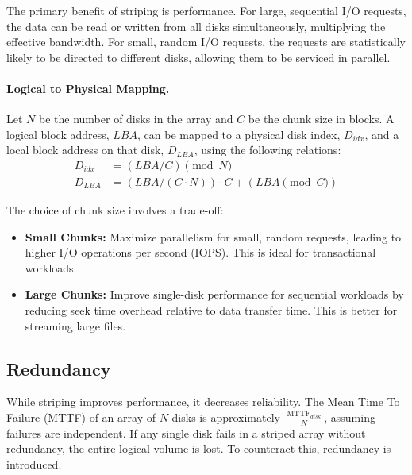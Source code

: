 \documentclass[12pt]{article}
\DeclareMathOperator{\MTTF}{MTTF}
\begin{document}
The primary benefit of striping is performance. For large, sequential I/O requests, the data can be read or written from all disks simultaneously, multiplying the effective bandwidth. For small, random I/O requests, the requests are statistically likely to be directed to different disks, allowing them to be serviced in parallel.

\paragraph{Logical to Physical Mapping.}
Let $N$ be the number of disks in the array and $C$ be the chunk size in blocks. A logical block address, $LBA$, can be mapped to a physical disk index, $D_{idx}$, and a local block address on that disk, $D_{LBA}$, using the following relations:
\begin{align}
    D_{idx} &= (LBA / C) \pmod{N} \label{eq:disk_idx} \\
    D_{LBA} &= (LBA / (C \cdot N)) \cdot C + (LBA \pmod{C}) \label{eq:disk_lba}
\end{align}

The choice of chunk size involves a trade-off:
\begin{itemize}
    \item \textbf{Small Chunks:} Maximize parallelism for small, random requests, leading to higher I/O operations per second (IOPS). This is ideal for transactional workloads.
    \item \textbf{Large Chunks:} Improve single-disk performance for sequential workloads by reducing seek time overhead relative to data transfer time. This is better for streaming large files.
\end{itemize}

\subsection{Redundancy}

While striping improves performance, it decreases reliability. The Mean Time To Failure (MTTF) of an array of $N$ disks is approximately $\frac{\MTTF_{disk}}{N}$, assuming failures are independent. If any single disk fails in a striped array without redundancy, the entire logical volume is lost. To counteract this, redundancy is introduced.
\end{document}
